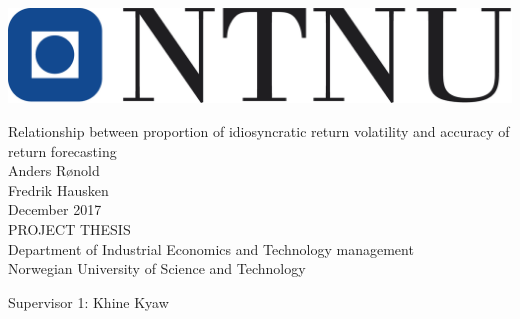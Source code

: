 \thispagestyle{empty}
\includegraphics[scale=0.4]{Pictures/ntnu.png}
\mbox{}\\[6pc]
\begin{center}
\Huge{Relationship between proportion of idiosyncratic return volatility and accuracy of return forecasting}\\[2pc]

\Large{Anders Rønold \\ Fredrik Hausken}\\[1pc]
\large{December 2017}\\[2pc]

PROJECT THESIS\\
Department of Industrial Economics and Technology management\\
Norwegian University of Science and Technology
\end{center}
\vfill

\noindent Supervisor 1: Khine Kyaw


